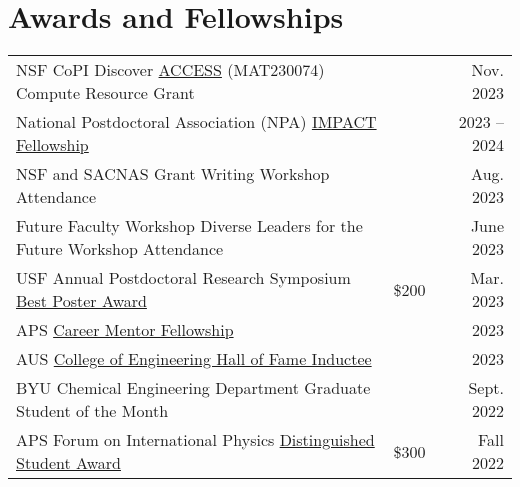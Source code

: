 \documentclass[letterpaper,11pt]{article}
\begin{document}
\vspace{-1.4\baselineskip}

\begin{refsection}[nopeer]
  \nocite{*}
  \setlength\bibitemsep{0pt}
  \printbibliography[resetnumbers=true,type=article,title={In Progress Publications},heading=fix]
\end{refsection}

\vspace{-1.4\baselineskip}
\section*{Awards and Fellowships}
\vspace{-0.5\baselineskip}
\begin{longtable}{@{}p{} p{} r@{}}
  NSF CoPI Discover \href{https://access-ci.org/}{ACCESS} (MAT230074) Compute Resource Grant 				& & Nov. 2023 \\[3.5pt]
  National Postdoctoral Association (NPA) \href{https://www.nationalpostdoc.org/general/custom.asp?page=IMPACTProgram}{IMPACT Fellowship} 	& & 2023 -- 2024\\[3.5pt]
  NSF and SACNAS Grant Writing Workshop Attendance                           									& & Aug. 2023 \\[3.5pt]
  Future Faculty Workshop Diverse Leaders for the Future Workshop Attendance 									& & June 2023 \\[3.5pt]
  USF Annual Postdoctoral Research Symposium \href{https://www.usf.edu/postdoctoral-affairs/postdoc-services/postdoc-spotlight.aspx#:~:text=BEST\%20POSTERS\%3A-,Pierre\%20Kawak,-Exploring\%20Mechanisms\%20of}{Best Poster Award}               & \$200 & Mar. 2023 \\[3.5pt]
  APS \href{https://www.aps.org/careers/guidance/mentoring.cfm}{Career Mentor Fellowship}                                               	& & 2023 \\[3.5pt]
  AUS \href{https://www.aus.edu/cen/alumni-hall-of-fame#:~:text=of\%20Technology\%20Sydney-,Dr.\%20Pierre\%20Kawak\%C2\%A0,-BS\%27\%2015\%20\%2D\%20Chemical}{College of Engineering Hall of Fame Inductee}                           & & 2023 \\[3.5pt]
  BYU Chemical Engineering Department Graduate Student of the Month          									& & Sept. 2022 \\[3.5pt]
  APS Forum on International Physics \href{https://engage.aps.org/fip/honors/prizes-awards/ds-program}{Distinguished Student Award}             & \$300 & Fall 2022 \\[3.5pt] %

\end{longtable}
\end{document}
